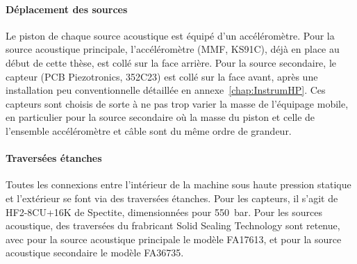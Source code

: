 \paragraph{Déplacement des sources} Le piston de chaque source acoustique est équipé d'un accéléromètre. Pour la source acoustique principale, l'accéléromètre (MMF, KS91C), déjà en place au début de cette thèse, est collé sur la face arrière. Pour la source secondaire, le capteur (PCB Piezotronics, 352C23) est collé sur la face avant, après une installation peu conventionnelle détaillée en annexe~\ref{chap:InstrumHP}. Ces capteurs sont choisis de sorte à ne pas trop varier la masse de l'équipage mobile, en particulier pour la source secondaire où la masse du piston et celle de l'ensemble accéléromètre et câble sont du même ordre de grandeur.

\paragraph{Traversées étanches} Toutes les connexions entre l'intérieur de la machine sous haute pression statique et l'extérieur se font via des traversées étanches. Pour les capteurs, il s'agit de HF2-8CU+16K de Spectite, dimensionnées pour \qty{550}{\bar}. Pour les sources acoustique, des traversées du frabricant Solid Sealing Technology sont retenue, avec pour la source acoustique principale le modèle FA17613, et pour la source acoustique secondaire le modèle FA36735. 



%    

